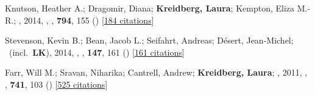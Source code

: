 \item[{\color{numcolor}\scriptsize3}] Knutson, Heather A.; Dragomir, Diana; \textbf{Kreidberg, Laura}; Kempton, Eliza M.-R.; \etal, 2014, , \apj, \textbf{794}, 155 () [\href{https://ui.adsabs.harvard.edu/abs/2014ApJ...794..155K}{184 citations}]

\item[{\color{numcolor}\scriptsize2}] Stevenson, Kevin B.; Bean, Jacob L.; Seifahrt, Andreas; D{\'e}sert, Jean-Michel; \etal\ (incl.\ \textbf{LK}), 2014, , \aj, \textbf{147}, 161 () [\href{https://ui.adsabs.harvard.edu/abs/2014AJ....147..161S}{161 citations}]

\item[{\color{numcolor}\scriptsize1}] Farr, Will M.; Sravan, Niharika; Cantrell, Andrew; \textbf{Kreidberg, Laura}; \etal, 2011, , \apj, \textbf{741}, 103 () [\href{https://ui.adsabs.harvard.edu/abs/2011ApJ...741..103F}{525 citations}]